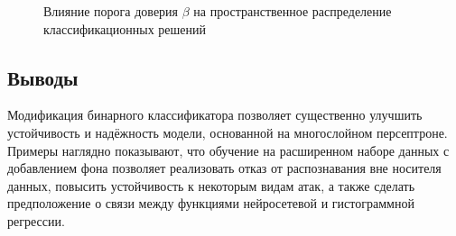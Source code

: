 \begin{figure}[ht]
    \caption{Влияние порога доверия \(\beta\) на пространственное распределение классификационных решений}
    \label{fig:beta_thresholds}
\end{figure}

\subsection{Выводы}

Модификация бинарного классификатора позволяет существенно улучшить устойчивость и надёжность модели, основанной на многослойном персептроне. Примеры наглядно показывают, что обучение на расширенном наборе данных с добавлением фона позволяет реализовать отказ от распознавания вне носителя данных, повысить устойчивость к некоторым видам атак, а также сделать предположение о связи между функциями нейросетевой и гистограммной регрессии.
